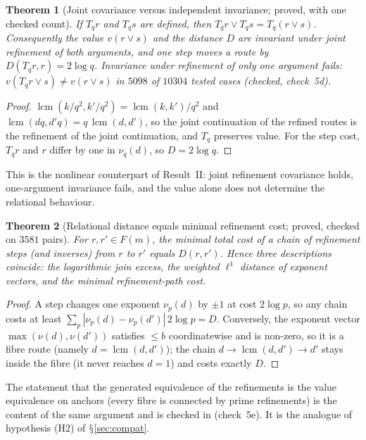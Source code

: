 \documentclass[11pt,a4paper]{article}
\renewcommand{\S}{\ensuremath{\mathsection}}
\newcommand{\lcm}{\operatorname{lcm}}
\newcommand{\vj}{\mathbin{\vee}}
\theoremstyle{plain}
\newtheorem{theorem}{Theorem}[section]
\theoremstyle{definition}
\begin{document}
\begin{theorem}[Joint covariance versus independent invariance; proved, with one checked count]\label{thm:nlcov}
If $T_qr$ and $T_qs$ are defined, then $T_qr\vj T_qs=T_q(r\vj s)$. Consequently the value $v(r\vj s)$ and the distance $D$ are invariant under \emph{joint} refinement of both arguments, and one step moves a route by $D(T_qr,r)=2\log q$. Invariance under refinement of only \emph{one} argument fails: $v(T_qr\vj s)\ne v(r\vj s)$ in $5098$ of $10304$ tested cases (checked,  check~5d).
\end{theorem}
\begin{proof}
$\lcm(k/q^2,k'/q^2)=\lcm(k,k')/q^2$ and $\lcm(dq,d'q)=q\,\lcm(d,d')$, so the joint continuation of the refined routes is the refinement of the joint continuation, and $T_q$ preserves value. For the step cost, $T_qr$ and $r$ differ by one in $\nu_q(d)$, so $D=2\log q$.
\end{proof}
\noindent This is the nonlinear counterpart of Result~II: joint refinement covariance holds, one-argument invariance fails, and the value alone does not determine the relational behaviour.

\begin{theorem}[Relational distance equals minimal refinement cost; proved, checked on $3581$ pairs]\label{thm:nlgeo}
For $r,r'\in F(m)$, the minimal total cost of a chain of refinement steps (and inverses) from $r$ to $r'$ equals $D(r,r')$. Hence three descriptions coincide: the logarithmic join excess, the weighted $\ell^1$ distance of exponent vectors, and the minimal refinement-path cost.
\end{theorem}
\begin{proof}
A step changes one exponent $\nu_p(d)$ by $\pm1$ at cost $2\log p$, so any chain costs at least $\sum_p|\nu_p(d)-\nu_p(d')|\,2\log p=D$. Conversely, the exponent vector $\max(\nu(d),\nu(d'))$ satisfies $\le b$ coordinatewise and is non-zero, so it is a fibre route (namely $d=\lcm(d,d')$); the chain $d\to\lcm(d,d')\to d'$ stays inside the fibre (it never reaches $d=1$) and costs exactly $D$.
\end{proof}
\noindent The statement that the generated equivalence of the refinements is the value equivalence on anchors (every fibre is connected by prime refinements) is the content of the same argument and is checked in  (check~5e). It is the analogue of hypothesis (H2) of \S\ref{sec:compat}.

\end{document}
